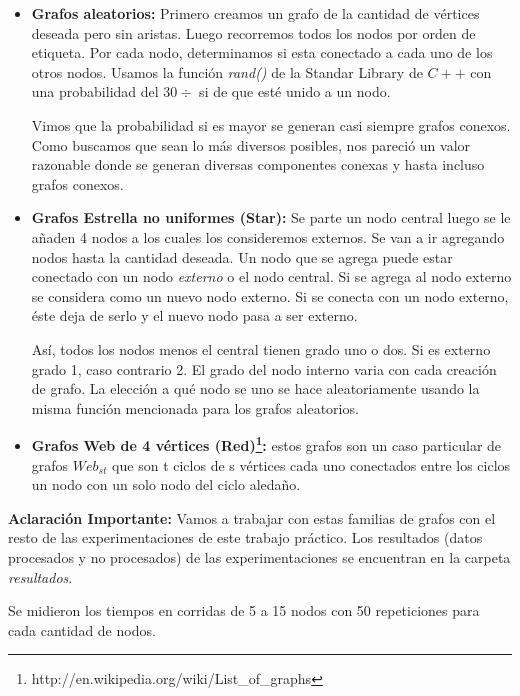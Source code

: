 \begin{itemize}
\item \textbf{Grafos aleatorios:} \quad Primero creamos un grafo de la cantidad de vértices deseada pero sin aristas. Luego recorremos todos los nodos por orden de etiqueta. Por cada nodo, determinamos si esta conectado a cada uno de los otros nodos. Usamos la función \textit{rand()} de la Standar Library de $C++$ con una probabilidad del $ 30\div $ si de que esté unido a un nodo. 

 \quad Vimos que la probabilidad si es mayor se generan casi siempre grafos conexos. Como buscamos que sean lo más diversos posibles, nos pareció un valor razonable donde se generan diversas componentes conexas y hasta incluso grafos conexos.

\quad

\item \textbf{Grafos Estrella no uniformes (Star):} \quad Se parte un nodo central luego se le añaden 4 nodos a los cuales los consideremos externos. Se van a ir agregando nodos hasta la cantidad deseada. Un nodo que se agrega puede estar conectado con un nodo \textit{externo} o el nodo central. Si se agrega al nodo externo se considera como un nuevo nodo externo. Si se conecta con un nodo externo, éste deja de serlo y el nuevo nodo pasa a ser externo. 

\quad Así, todos los nodos menos el central tienen grado uno o dos. Si es externo grado 1, caso contrario 2. El grado del nodo interno varia con cada creación de grafo. La elección a qué nodo se uno se hace aleatoriamente usando la misma función mencionada para los grafos aleatorios.

\quad

\item \textbf{Grafos Web de 4 vértices (Red)\footnote{http://en.wikipedia.org/wiki/List\_of\_graphs}:} \quad estos grafos son un caso particular de grafos $ Web_{s t} $ que son t ciclos de s vértices cada uno conectados entre los ciclos un nodo con un solo nodo del ciclo aledaño. 
\end{itemize}

\quad

\quad \textbf{Aclaración Importante:} Vamos a trabajar con estas familias de grafos con el resto de las experimentaciones de este trabajo práctico. Los resultados (datos procesados y no procesados) de las experimentaciones se encuentran en la carpeta \textit{resultados}.

\quad 

\quad Se midieron los tiempos en corridas de  5 a 15 nodos con 50 repeticiones para cada cantidad de nodos.


